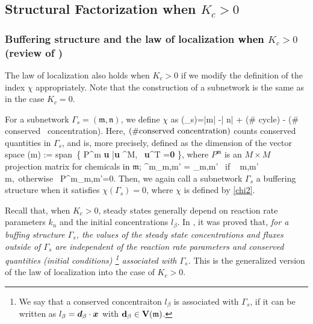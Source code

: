 \documentclass[ amsmath,amssymb,nofootinbib
]{revtex4-1}
\def\bal#1\eal{\begin{align}#1\end{align}}
\def\mbf#1{\mbox{\boldmath $#1$}}
\newcommand{\bR}{\mathbb{R}}
\newcommand{\red}[1]{\textcolor{black}{#1}}
\begin{document}
\subsection{ Structural Factorization when  $K_c >0$}\label{sec:fac}

\subsubsection{Buffering structure and the law of localization \red{when} $K_c >0$ (review of \cite{OMpre}) }

The law of localization also holds when $K_c >0$ if we modify the definition of the index $\chi$ appropriately.
Note that the construction of a subnetwork is the same as in the case  $K_c =0$.

 For a subnetwork $\Gamma_s=(\mathfrak m, \mathfrak n)$, we define  $\chi$  as
\bal
\chi (\Gamma_s)=|\mathfrak m| -| \mathfrak n| + (\# {\rm cycle})  - (\# {\rm conserved \ concentration}).\label{chi2}
\eal
Here, $(\# {\rm conserved \ concentration})$ counts conserved quantities in $\Gamma_s$, and is, more precisely, defined as the dimension of the vector space
\bal
V(\mathfrak m) := {\rm span}\, \bigl\{  P^{\mathfrak m}  {\bf u}   |{\bf u} \in\bR^{M},  \, {\bf u}^T \nu ={\bf 0}   \bigr\}, \label{vm}
\eal
where $ P^{\mathfrak m} $ is an $M\times M$ projection matrix for chemicals \red{in} $\mathfrak m$;
\bal
P^{\mathfrak m}_{m,m'} = \delta_{m,m'} {\ \rm if \ } m,m' \in \mathfrak m,\  {\rm otherwise} \ P^{\mathfrak m}_{m,m'}=0.
\eal
Then, we again call a subnetwork $\Gamma_s$ a buffering structure when it satisfies $\chi(\Gamma_s) = 0$, where $\chi$ is defined by \eqref{chi2}.

Recall that, when  $K_c >0$,  steady states generally depend on reaction rate parameters $k_n$ and the initial concentrations $l_\beta$. In \cite{OMpre}, it was proved  that,
{\it for a buffing structure $\Gamma_s$, the values of the steady state concentrations and fluxes outside of $\Gamma_s$ are independent of the reaction rate parameters and conserved quantities (initial conditions) \footnote{We say that a conserved concentraiton $l_\beta$  is associated with $\Gamma_s$, if it can be written as $l_\beta = {\mbf d}_\beta \cdot {\mbf x}$ with $\bf d_\beta \in V(\mathfrak m)$. } associated with $\Gamma_s$.}
This is the generalized version of the law of localization into the case of  $K_c >0$.



\end{document}
